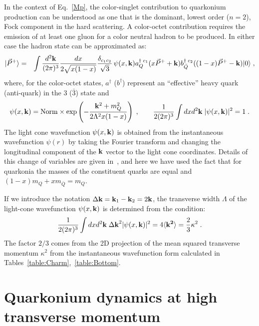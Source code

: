\documentclass[article,showpacs,preprintnumbers,amsmath,amssymb]{revtex4}
\begin{document}
In the context of Eq.~\ref{Mp},  the color-singlet contribution to quarkonium 
production can be understood  as one that is the dominant, lowest order ($n=2$), 
Fock component in the hard scattering.  A color-octet contribution requires 
the emission of at least one gluon for a color neutral hadron to be
produced. In either case the hadron state can be 
approximated as:
\begin{eqnarray}       
 |\vec{P}^+ \rangle 
&=& \int \frac{d^2{\bf k}}{(2\pi)^{3}} \frac{dx}{ 2\sqrt{ x(1-x)}}
  \frac{\delta_{c_1c_2}}{\sqrt{3}} \,
\psi(x,{\bf k})
 a_Q^{\dagger\;  c_1 }(x\vec{P}^++{\bf k})  b_{\bar{Q}}^{\dagger \;  c_2  }
((1-x)\vec{P}^+-{\bf k})  |0 \rangle  \; , 
\label{Mp1}
\end{eqnarray}       
where, for the color-octet states, $a^\dagger$ ($b^\dagger$) represent an 
``effective'' heavy quark (anti-quark) in the $3$ ($\bar{3}$) state and~\cite{Sharma:2009hn}  
\begin{equation}
  \psi(x,{\bf k}) = {\rm Norm} \times \exp\left( - \frac{{\bf k}^2 + m_Q^2 }{2 \Lambda^2 x(1-x) }   
  \right) \;   , \qquad 
\frac{1}{2 (2\pi)^{3} } \int dx d^2{\bf k}  \;
| \psi(x,{\bf k}) |^2 = 1 \; .
\label{lonorm}
\end{equation}
The light cone wavefunction $\psi(x, {\bf{k}})$ is obtained from the
instantaneous wavefunction $\psi(r)$ by taking the Fourier transform and
changing the longitudinal component of the ${\bf{k}}$ vector to the light cone
coordinates. Details of this change of variables are given
in~\cite{Sharma:2009hn}, and here we have used the fact that for quarkonia the
masses of the constituent quarks are equal and $(1-x)m_Q +x m_{\bar{Q}} =
m_{Q}$.

If we introduce the notation $\Delta {\bf k} = {\bf k}_1-{\bf k}_2 = 2 {\bf
k}$, the transverse width  $\Lambda$ of the light-cone wavefunction
$\psi(x,{\bf k})$  is determined from the condition: 
\begin{equation}
\frac{1}{2 (2\pi)^{3} } \int dx d^2{\bf k}  \;
{\Delta \bf k}^2  | \psi(x,{\bf k}) |^2 =  4\langle {\bf k^2} \rangle =  \frac{2}{3} \kappa^2  \; .
\label{lonorm2}
\end{equation}
The factor $2/3$ comes from the 2D projection of the mean squared  transverse
momentum $\kappa^2$ from the instantaneous wavefunction form calculated in
Tables~\ref{table:Charm},~\ref{table:Bottom}.


\section{Quarkonium dynamics at high transverse
momentum~\label{section:QGPdynamics}}
\end{document}
